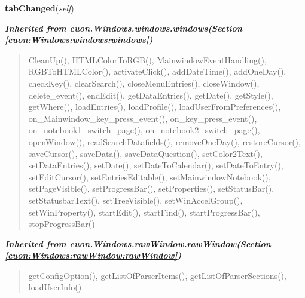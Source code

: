     \label{cuon:Finances:InvoiceBook:invoicebook:invoicebookwindow:tabChanged}

    \vspace{0.5ex}

\hspace{.8\funcindent}\begin{boxedminipage}{\funcwidth}

    \raggedright \textbf{tabChanged}(\textit{self})

\setlength{\parskip}{2ex}
\setlength{\parskip}{1ex}
    \end{boxedminipage}


\large{\textbf{\textit{Inherited from cuon.Windows.windows.windows\textit{(Section \ref{cuon:Windows:windows:windows})}}}}

\begin{quote}
CleanUp(), HTMLColorToRGB(), MainwindowEventHandling(), RGBToHTMLColor(), activateClick(), addDateTime(), addOneDay(), checkKey(), clearSearch(), closeMenuEntries(), closeWindow(), delete\_event(), endEdit(), getDataEntries(), getDate(), getStyle(), getWhere(), loadEntries(), loadProfile(), loadUserFromPreferences(), on\_Mainwindow\_key\_press\_event(), on\_key\_press\_event(), on\_notebook1\_switch\_page(), on\_notebook2\_switch\_page(), openWindow(), readSearchDatafields(), removeOneDay(), restoreCursor(), saveCursor(), saveData(), saveDataQuestion(), setColor2Text(), setDataEntries(), setDate(), setDateToCalendar(), setDateToEntry(), setEditCursor(), setEntriesEditable(), setMainwindowNotebook(), setPageVisible(), setProgressBar(), setProperties(), setStatusBar(), setStatusbarText(), setTreeVisible(), setWinAccelGroup(), setWinProperty(), startEdit(), startFind(), startProgressBar(), stopProgressBar()
\end{quote}

\large{\textbf{\textit{Inherited from cuon.Windows.rawWindow.rawWindow\textit{(Section \ref{cuon:Windows:rawWindow:rawWindow})}}}}

\begin{quote}
getConfigOption(), getListOfParserItems(), getListOfParserSections(), loadUserInfo()
\end{quote}

